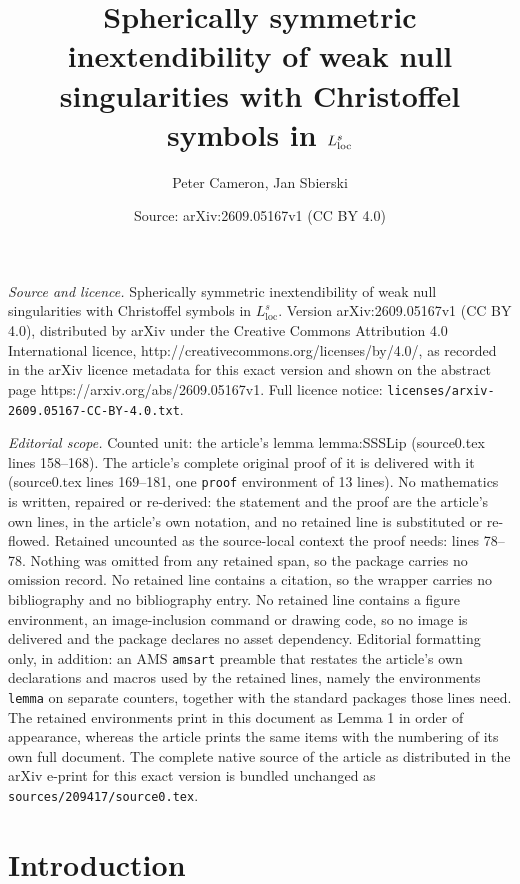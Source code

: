 \documentclass[10pt,a4paper]{amsart}
\title{Spherically symmetric inextendibility of weak null singularities with Christoffel symbols in $L^s_{\loc}$}
\author{Peter Cameron, Jan Sbierski}
\date{Source: arXiv:2609.05167v1 (CC BY 4.0)}
\newcommand{\loc}{\mathrm{loc}}
\begin{document}
\maketitle

\noindent\emph{Source and licence.} Spherically symmetric inextendibility of weak null singularities with Christoffel symbols in $L^s_{\loc}$. Version arXiv:2609.05167v1 (CC BY 4.0), distributed by arXiv under the Creative Commons Attribution 4.0 International licence, http://creativecommons.org/licenses/by/4.0/, as recorded in the arXiv licence metadata for this exact version and shown on the abstract page https://arxiv.org/abs/2609.05167v1. Full licence notice: \texttt{licenses/arxiv-2609.05167-CC-BY-4.0.txt}.\par\smallskip

\noindent\textit{Editorial scope.} Counted unit: the article's lemma lemma:SSSLip (source0.tex lines 158--168). The article's complete original proof of it is delivered with it (source0.tex lines 169--181, one \texttt{proof} environment of 13 lines). No mathematics is written, repaired or re-derived: the statement and the proof are the article's own lines, in the article's own notation, and no retained line is substituted or re-flowed.  Retained uncounted as the source-local context the proof needs: lines 78--78.  Nothing was omitted from any retained span, so the package carries no omission record.  No retained line contains a citation, so the wrapper carries no bibliography and no bibliography entry.  No retained line contains a figure environment, an image-inclusion command or drawing code, so no image is delivered and the package declares no asset dependency.  Editorial formatting only, in addition: an AMS \texttt{amsart} preamble that restates the article's own declarations and macros used by the retained lines, namely the environments \texttt{lemma} on separate counters, together with the standard packages those lines need.  The retained environments print in this document as Lemma 1 in order of appearance, whereas the article prints the same items with the numbering of its own full document.  The complete native source of the article as distributed in the arXiv e-print for this exact version is bundled unchanged as \texttt{sources/209417/source0.tex}.
\section{Introduction}\label{Introduction}
\end{document}
